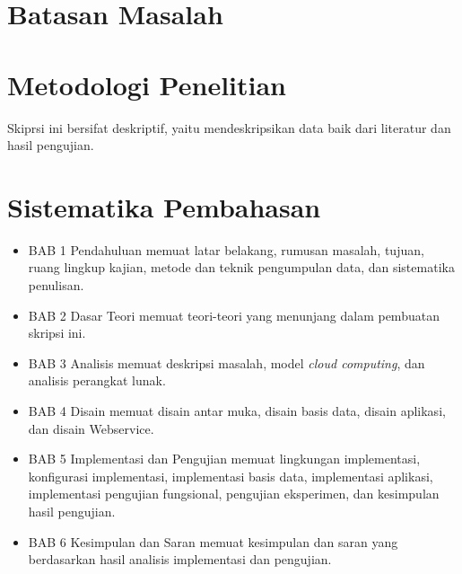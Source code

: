 \section{Batasan Masalah}
\label{sec:batasanmasalah}

\section{Metodologi Penelitian}
\label{sec:metodologipenelitian}

Skiprsi ini bersifat deskriptif, yaitu mendeskripsikan data baik dari literatur dan hasil pengujian.

\section{Sistematika Pembahasan}
\label{sec:sistematikapembahasan}

\begin{itemize}
	\item BAB 1 Pendahuluan memuat latar belakang, rumusan masalah, tujuan, ruang lingkup kajian, metode dan teknik pengumpulan data, dan sistematika penulisan.
	\item BAB 2 Dasar Teori memuat teori-teori yang menunjang dalam pembuatan skripsi ini.
	\item BAB 3 Analisis memuat deskripsi masalah, model \textit{cloud computing}, dan analisis perangkat lunak.
	\item BAB 4 Disain memuat disain antar muka, disain basis data, disain aplikasi, dan disain Webservice.
	\item BAB 5 Implementasi dan Pengujian memuat lingkungan implementasi, konfigurasi implementasi, implementasi basis data, implementasi aplikasi, implementasi pengujian fungsional, pengujian eksperimen, dan kesimpulan hasil pengujian.
	\item BAB 6 Kesimpulan dan Saran memuat kesimpulan dan saran yang berdasarkan hasil analisis implementasi dan pengujian.
\end{itemize}